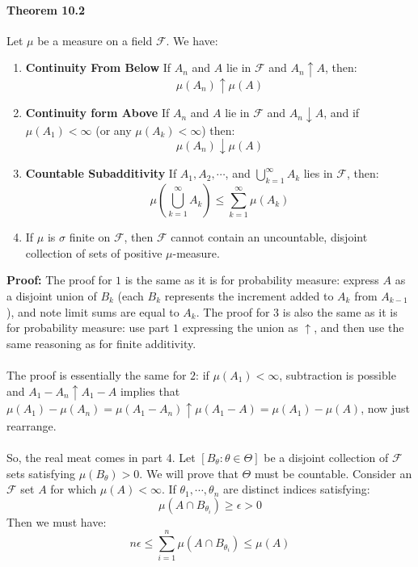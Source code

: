 \documentclass[12pt,a4paper]{article}
\newcommand{\1}[1]{\mathbbm{1}\left\{ #1 \right\}}
\newcommand{\fcal}{\mathcal{F}}
\begin{document}
\paragraph{Theorem 10.2} Let $\mu$ be a measure on a field $\fcal$. We have:
\begin{enumerate}
	\item \textbf{Continuity From Below} If $A_n$ and $A$ lie in $\fcal$ and $A_n \uparrow A$, then:
	$$
		\mu(A_n) \uparrow \mu(A)
	$$
	
	\item \textbf{Continuity form Above} If $A_n$ and $A$ lie in $\fcal$ and $A_n \downarrow A$, and if $\mu(A_1) < \infty$ (or any $\mu(A_k) < \infty$) then:
	$$
		\mu(A_n) \downarrow \mu(A)
	$$
	
	\item \textbf{Countable Subadditivity} If $A_1, A_2, \cdots$, and $\bigcup_{k=1}^\infty A_k$ lies in $\fcal$, then:
	$$
		\mu\left(\bigcup_{k=1}^\infty A_k\right) \leq \sum_{k=1}^\infty \mu(A_k)
	$$
	
	\item If $\mu$ is $\sigma$ finite on $\fcal$, then $\fcal$ cannot contain an uncountable, disjoint collection of sets of positive $\mu$-measure.
\end{enumerate}
\textbf{Proof:} The proof for $1$ is the same as it is for probability measure: express $A$ as a disjoint union of $B_k$ (each $B_k$ represents the increment added to $A_k$ from $A_{k-1}$), and note limit sums are equal to $A_k$. The proof for $3$ is also the same as it is for probability measure: use part $1$ expressing the union as $\uparrow$, and then use the same reasoning as for finite additivity.
\\\\
The proof is essentially the same for $2$: if $\mu(A_1) < \infty$, subtraction is possible and $A_1 - A_n \uparrow A_1 - A$ implies that $\mu(A_1) - \mu(A_n) = \mu(A_1 - A_n) \uparrow \mu(A_1 - A) = \mu(A_1) - \mu(A)$, now just rearrange.
\\\\
So, the real meat comes in part 4. Let $\left[B_\theta: \theta \in \Theta\right]$ be a disjoint collection of $\fcal$ sets satisfying $\mu(B_\theta) > 0$. We will prove that $\Theta$ must be countable. Consider an $\fcal$ set $A$ for which $\mu(A) < \infty$. If $\theta_1, \cdots, \theta_n$ are distinct indices satisfying:
$$
	\mu\left(A \cap B_{\theta_i}\right) \geq \epsilon > 0
$$
Then we must have:
$$
	n\epsilon \leq \sum_{i=1}^n \mu(A \cap B_{\theta_i}) \leq \mu(A)
$$
\end{document}
